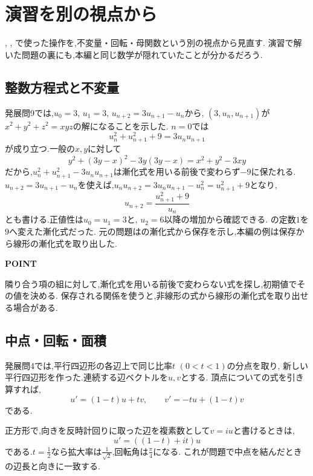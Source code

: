 \section{演習を別の視点から}\label{節：演習を別の視点から}
,
,
で使った操作を,不変量・回転・母関数という別の視点から見直す.
演習で解いた問題の裏にも,本編と同じ数学が隠れていたことが分かるだろう.

\subsection{整数方程式と不変量}
発展問9では,$u_0=3$, $u_1=3$, $u_{n+2}=3u_{n+1}-u_n$から,
$(3,u_n,u_{n+1})$が$x^2+y^2+z^2=xyz$の解になることを示した.
$n=0$では
\[
  u_n^2+u_{n+1}^2+9=3u_nu_{n+1}
\]
が成り立つ.一般の$x,y$に対して
\[
  y^2+(3y-x)^2-3y(3y-x)=x^2+y^2-3xy
\]
だから,$u_n^2+u_{n+1}^2-3u_nu_{n+1}$は漸化式を用いる前後で変わらず$-9$に保たれる.
$u_{n+2}=3u_{n+1}-u_n$を使えば,$u_nu_{n+2}=3u_nu_{n+1}-u_n^2=u_{n+1}^2+9$となり,
\[
  u_{n+2}=\frac{u_{n+1}^2+9}{u_n}
\]
とも書ける.正値性は$u_0=u_1=3$と,
$u_2=6$以降の増加から確認できる.
の定数$1$を$9$へ変えた漸化式だった.
元の問題はの漸化式から保存を示し,本編の例は保存から線形の漸化式を取り出した.

\begin{bookpoint}
  \textbf{POINT}\par
  隣り合う項の組に対して,漸化式を用いる前後で変わらない式を探し,初期値でその値を決める.
  保存される関係を使うと,非線形の式から線形の漸化式を取り出せる場合がある.
\end{bookpoint}

\subsection{中点・回転・面積}
発展問4では,平行四辺形の各辺上で同じ比率$t$ $(0<t<1)$の分点を取り,
新しい平行四辺形を作った.連続する辺ベクトルを$u,v$とする.
頂点についての式を引き算すれば,
\[
  u'=(1-t)u+tv,\qquad v'=-tu+(1-t)v
\]
である.

正方形で,向きを反時計回りに取った辺を複素数として$v=iu$と書けるときは,
\[
  u'=((1-t)+it)u
\]
である.$t=\frac12$なら拡大率は$\frac1{\sqrt2}$,回転角は$\frac\pi4$になる.
これが問題で中点を結んだときの辺長と向きに一致する.

